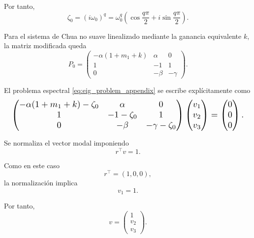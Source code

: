 \documentclass[journal]{IEEEtran}
\begin{document}
Por tanto,
\begin{equation}
\label{eq:zeta0_explicit_appendix}
\zeta_0
=
(i\omega_0)^q
=
\omega_0^q
\left(
\cos\frac{q\pi}{2}
+
i\sin\frac{q\pi}{2}
\right).
\end{equation}

Para el sistema de Chua no suave linealizado mediante la ganancia equivalente \(k\), la matriz modificada queda
\begin{equation}
\label{eq:P0_matrix_appendix}
P_0=
\begin{pmatrix}
-\alpha(1+m_1+k) & \alpha & 0\\
1 & -1 & 1\\
0 & -\beta & -\gamma
\end{pmatrix}.
\end{equation}

El problema espectral \eqref{eq:eig_problem_appendix} se escribe explícitamente como
\begin{equation}
\label{eq:matrix_eig_appendix}
\resizebox{0.98\columnwidth}{!}{$\displaystyle
\begin{pmatrix}
-\alpha(1+m_1+k)-\zeta_0 & \alpha & 0\\
1 & -1-\zeta_0 & 1\\
0 & -\beta & -\gamma-\zeta_0
\end{pmatrix}
\begin{pmatrix}
v_1\\
v_2\\
v_3
\end{pmatrix}
=
\begin{pmatrix}
0\\
0\\
0
\end{pmatrix}.$}
\end{equation}

Se normaliza el vector modal imponiendo
\begin{equation}
\label{eq:normalization_appendix}
r^\top v=1.
\end{equation}

Como en este caso
\[
r^\top=(1,0,0),
\]
la normalización implica
\begin{equation}
v_1=1.
\end{equation}

Por tanto,
\begin{equation}
\label{eq:v_param_appendix}
v=
\begin{pmatrix}
1\\
v_2\\
v_3
\end{pmatrix}.
\end{equation}
\end{document}
